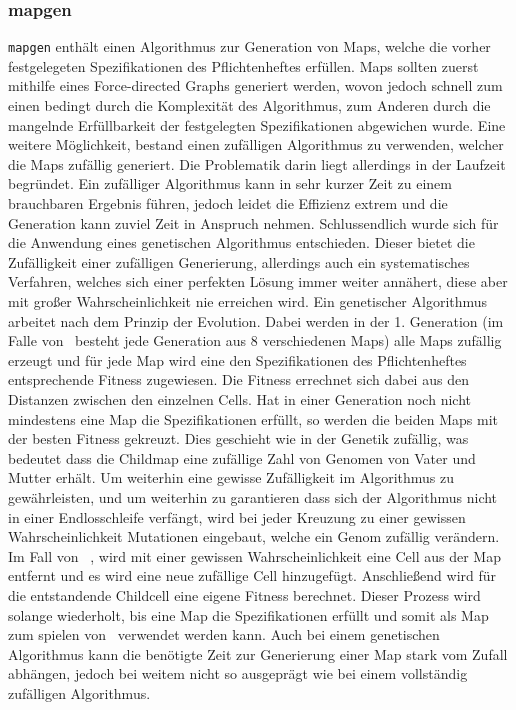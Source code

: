 \subsubsection{mapgen}
\verb+mapgen+ enthält einen Algorithmus zur Generation von Maps, welche die vorher festgelegeten Spezifikationen des Pflichtenheftes erfüllen. Maps sollten zuerst mithilfe eines Force-directed Graphs generiert werden, wovon jedoch schnell zum einen bedingt durch die Komplexität des Algorithmus, zum Anderen durch die mangelnde Erfüllbarkeit der festgelegten Spezifikationen abgewichen wurde. Eine weitere Möglichkeit, bestand einen zufälligen Algorithmus zu verwenden, welcher die Maps zufällig generiert. Die Problematik darin liegt allerdings in der Laufzeit begründet. Ein zufälliger Algorithmus kann in sehr kurzer Zeit zu einem brauchbaren Ergebnis führen, jedoch leidet die Effizienz extrem und die Generation kann zuviel Zeit in Anspruch nehmen. Schlussendlich wurde sich für die Anwendung eines genetischen Algorithmus entschieden. Dieser bietet die Zufälligkeit einer zufälligen Generierung, allerdings auch ein systematisches Verfahren, welches sich einer perfekten Lösung immer weiter annähert, diese aber mit großer Wahrscheinlichkeit nie erreichen wird. Ein genetischer Algorithmus arbeitet nach dem Prinzip der Evolution. Dabei werden in der 1. Generation (im Falle von \vires\ besteht jede Generation aus 8 verschiedenen Maps) alle Maps zufällig erzeugt und für jede Map wird eine den Spezifikationen des Pflichtenheftes entsprechende Fitness zugewiesen. Die Fitness errechnet sich dabei aus den Distanzen zwischen den einzelnen Cells. Hat in einer Generation noch nicht mindestens eine Map die Spezifikationen erfüllt, so werden die beiden Maps mit der besten Fitness gekreuzt. Dies geschieht wie in der Genetik zufällig, was bedeutet dass die Childmap eine zufällige Zahl von Genomen von Vater und Mutter erhält. Um weiterhin eine gewisse Zufälligkeit im Algorithmus zu gewährleisten, und um weiterhin zu garantieren dass sich der Algorithmus nicht in einer Endlosschleife verfängt, wird bei jeder Kreuzung zu einer gewissen Wahrscheinlichkeit Mutationen eingebaut, welche ein Genom zufällig verändern. Im Fall von \vires\ , wird mit einer gewissen Wahrscheinlichkeit eine Cell aus der Map entfernt und es wird eine neue zufällige Cell hinzugefügt. Anschließend wird für die entstandende Childcell eine eigene Fitness berechnet. Dieser Prozess wird solange wiederholt, bis eine Map die Spezifikationen erfüllt und somit als Map zum spielen von \vires\ verwendet werden kann. Auch bei einem genetischen Algorithmus kann die benötigte Zeit zur Generierung einer Map stark vom Zufall abhängen, jedoch bei weitem nicht so ausgeprägt wie bei einem vollständig zufälligen Algorithmus.
